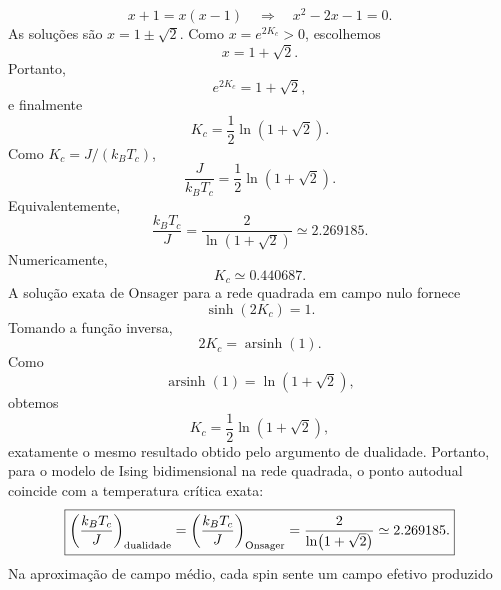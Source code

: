 \documentclass[11pt,a4paper]{article}
\begin{document}
%
\begin{equation}
    x+1=x(x-1)
    \quad\Longrightarrow\quad
    x^2-2x-1=0.
\end{equation}
%
As soluções são \(x=1\pm\sqrt2\). Como \(x=e^{2K_c}>0\), escolhemos
%
\begin{equation}
    x=1+\sqrt2.
\end{equation}
%
Portanto,
%
\begin{equation}
    e^{2K_c}=1+\sqrt2,
\end{equation}
%
e finalmente
%
\begin{equation}
    K_c
    =
    \frac12\ln(1+\sqrt2).
    \label{eq:Kc_exact}
\end{equation}
%
Como \(K_c=J/(k_BT_c)\),
%
\begin{equation}
    \frac{J}{k_BT_c}
    =
    \frac12\ln(1+\sqrt2).
    \label{eq:critical_temperature_dimensionless}
\end{equation}
%
Equivalentemente,
%
\begin{equation}
    \frac{k_BT_c}{J}
    =
    \frac{2}{\ln(1+\sqrt2)}
    \simeq 2.269185.
    \label{eq:Tc_exact_dimensionless}
\end{equation}
%
Numericamente,
%
\begin{equation}
    K_c\simeq0.440687.
\end{equation}
%
A solução exata de Onsager para a rede quadrada em campo nulo fornece
%
\begin{equation}
    \sinh(2K_c)=1.
    \label{eq:onsager_condition}
\end{equation}
%
Tomando a função inversa,
%
\begin{equation}
    2K_c=\operatorname{arsinh}(1).
\end{equation}
%
Como
%
\begin{equation}
    \operatorname{arsinh}(1)
    =
    \ln(1+\sqrt2),
\end{equation}
%
obtemos
%
\begin{equation}
    K_c=\frac12\ln(1+\sqrt2),
\end{equation}
%
exatamente o mesmo resultado obtido pelo argumento de dualidade. Portanto, para o modelo de Ising bidimensional na rede quadrada, o ponto autodual coincide com a temperatura crítica exata:
%
\begin{equation}
    \boxed{
    \left(\frac{k_BT_c}{J}\right)_{\rm dualidade}
    =
    \left(\frac{k_BT_c}{J}\right)_{\rm Onsager}
    =
    \frac{2}{\ln(1+\sqrt2)}
    \simeq2.269185.
    }
\end{equation}
%
Na aproximação de campo médio, cada spin sente um campo efetivo produzido
\end{document}
